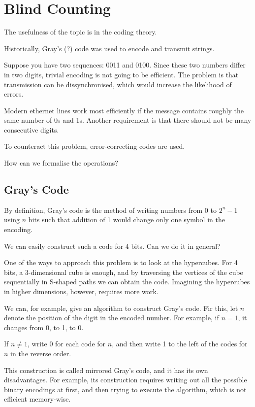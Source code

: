 \documentclass[11pt]{scrartcl}
\begin{document}
  \section{Blind Counting}

  The usefulness of the topic is in the coding theory.

  Historically, Gray's (?) code was used to encode and transmit strings.

  Suppose you have two sequences: 0011 and 0100. Since these two
  numbers differ in two digits, trivial encoding is not going to be
  efficient. The problem is that transmission can be dissynchronised,
  which would increase the likelihood of errors.

  Modern ethernet lines work most efficiently if the message contains
  roughly the same number of 0s and 1s. Another requirement is that
  there should not be many consecutive digits.

  To counteract this problem, error-correcting codes are used.

  How can we formalise the operations?

  \subsection{Gray's Code}

  By definition, Gray's code is the method of writing numbers from 0
  to $2^{n}-1$ using $n$ bits such that addition of 1 would change
  only one symbol in the encoding.

  We can easily construct such a code for 4 bits. Can we do it in general?

  One of the ways to approach this problem is to look at the
  hypercubes. For 4 bits, a 3-dimensional cube is enough, and by
  traversing the vertices of the cube sequentially in S-shaped paths
  we can obtain the code. Imagining the hypercubes in higher
  dimensions, however, requires more work.

  We can, for example, give an algorithm to construct Gray's code. Fir
  this, let $n$ denote the position of the digit in the encoded
  number. For example, if $n=1$, it changes from 0, to 1, to 0.

  If $n\neq 1$, write 0 for each code for $n$, and then write 1 to the
  left of the codes for $n$ in the reverse order.

  This construction is called mirrored Gray's code, and it has its own
  disadvantages. For example, its construction requires writing out
  all the possible binary encodings at first, and then trying to
  execute the algorithm, which is not efficient memory-wise.
\end{document}
